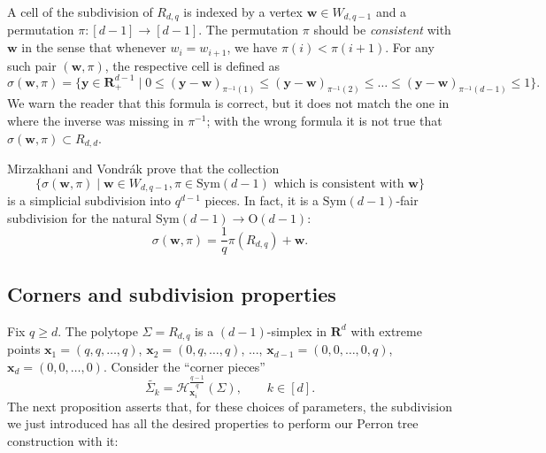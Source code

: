 \documentclass[10pt]{amsart}
\newcommand{\R}{\mathbf{R}}
\begin{document}
\begin{appendix}
A cell of the subdivision of $R_{d,q}$ is indexed by a vertex $\mathbf{w}\in W_{d,q-1}$ and a permutation $\pi: [d-1]\to [d-1]$. The permutation $\pi$ should be \textit{consistent} with $\mathbf{w}$ in the sense that whenever $w_i=w_{i+1}$, we have $\pi(i)<\pi(i+1)$. For any such pair $(\mathbf{w},\pi)$, the respective cell is defined as
\begin{equation*}
    \sigma(\mathbf{w},\pi)=\{\mathbf{y}\in \R^{d-1}_+\mid 0\leq (\mathbf{y}-\mathbf{w})_{\pi^{-1}(1)}\leq (\mathbf{y}-\mathbf{w})_{\pi^{-1}(2)}\leq \dots\leq (\mathbf{y}-\mathbf{w})_{\pi^{-1}(d-1)}\leq 1\}.
\end{equation*}
We warn the reader that this formula is correct, but it does not match the one in \cite{RefWorks:mirzakhani2015sperners} where the inverse was missing in $\pi^{-1}$; with the wrong formula it is not true that $\sigma(\mathbf{w},\pi)\subset R_{d,d}$.

Mirzakhani and Vondrák \cite{RefWorks:mirzakhani2015sperners} prove that the collection \begin{equation}\label{eq:MVsubdivision}\big\{ \sigma(\mathbf{w},\pi) \mid \mathbf{w}\in W_{d,q-1}, \pi \in \mathrm{Sym}(d-1)\textrm{ which is consistent with }\mathbf{w}\big\}
\end{equation}
is a simplicial subdivision into $q^{d-1}$ pieces. In fact, it is a $\mathrm{Sym}(d-1)$-fair subdivision for the natural $\mathrm{Sym}(d-1) \to \mathrm{O}(d-1)$:
\[ \sigma(\mathbf{w},\pi) = \frac 1 q \pi(R_{d,q})+\mathbf{w}.\]



\subsection{Corners and subdivision properties}
Fix $q\geq d$. The  polytope $\Sigma=R_{d,q}$ is a $(d-1)$-simplex in $\R^d$ with extreme points $\mathbf{x}_1=(q,q,\dots,q)$, $\mathbf{x}_2=(0,q,\dots,q)$, ..., $\mathbf{x}_{d-1}=(0,0,\dots,0,q)$, $\mathbf{x}_{d}=(0,0,\dots,0)$. 
Consider the ``corner pieces''
\begin{equation*}
    \widetilde{\Sigma_k}=\mathcal{H}_{\mathbf{x}_i}^{\frac{q-1}{q}}(\Sigma),\qquad k\in [d].
\end{equation*}
The next proposition asserts that, for these choices of parameters, the subdivision we just introduced has all the desired properties to perform our Perron tree construction with it:



\end{appendix}
\end{document}
